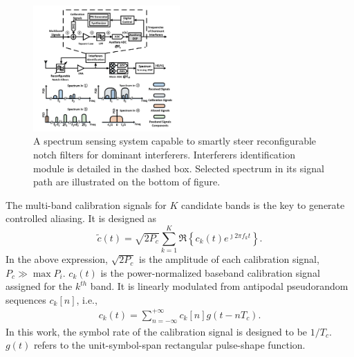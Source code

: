 \documentclass{IEEEtran}
\begin{document}

\begin{figure}
\begin{center}
\includegraphics[width=0.5\textwidth]{figure/system_all_TCCN}
\end{center}
\vspace{-6mm}
\caption{A spectrum sensing system capable to smartly steer reconfigurable notch filters for dominant interferers. Interferers identification module is detailed in the dashed box. Selected spectrum in its signal path are illustrated on the bottom of figure.}
\vspace{-4mm}
\label{fig:system_schematic}
\end{figure}


The multi-band calibration signals for $K$ candidate bands is the key to generate controlled aliasing. It is designed as
\begin{equation}
\tilde{c}(t) = \sqrt{2P_c}\sum\limits_{k=1}^{K} \Re \left\{c_k(t) e ^{\jmath 2\pi f_{k}t}\right\}.
\end{equation}
In the above expression, $\sqrt{2P_{c}}$ is the amplitude of each calibration signal, $P_c \gg \max{P_i}$. $c_{k}(t)$ is the power-normalized baseband calibration signal assigned for the $k^{th}$ band. It is linearly modulated from antipodal pseudorandom sequences $c_k[n]$, i.e.,
\begin{align}
c_k(t) = \sum\limits_{n=-\infty}^{+\infty}c_k[n]g\left(t-nT_c\right).
\end{align}
In this work, the symbol rate of the calibration signal is designed to be $1/T_c$. $g(t)$ refers to the unit-symbol-span rectangular pulse-shape function. 
\end{document}
